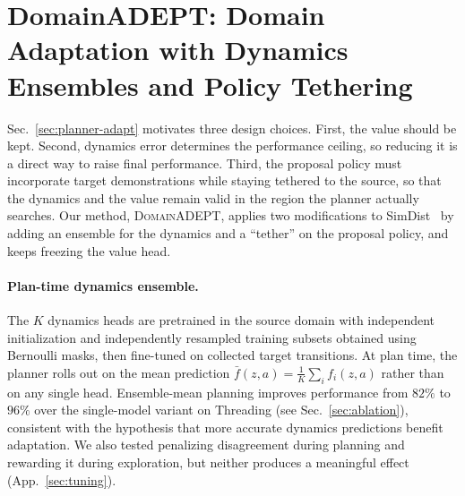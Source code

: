 \documentclass{article} %
\newcommand{\DomainADEPT}{\textsc{DomainADEPT}\xspace}
\begin{document}
\section{DomainADEPT: Domain Adaptation with Dynamics Ensembles and Policy Tethering}
\label{sec:simadept}

Sec.~\ref{sec:planner-adapt} motivates three design choices. First, the value should be kept. Second, dynamics error determines the performance ceiling, so reducing it is a direct way to raise final performance. Third, the proposal policy must incorporate target demonstrations while staying tethered to the source, so that the dynamics and the value remain valid in the region the planner actually searches. Our method, \DomainADEPT, applies two modifications to SimDist~\citep{levy2026simulation} by adding an ensemble for the dynamics and a ``tether'' on the proposal policy, and keeps freezing the value head.

\paragraph{Plan-time dynamics ensemble.}
The $K$ dynamics heads are pretrained in the source domain with independent initialization and independently resampled training subsets obtained using Bernoulli masks, then fine-tuned on collected target transitions. At plan time, the planner rolls out on the mean prediction $\bar{f}(z,a)=\frac{1}{K}\sum_i f_i(z,a)$ rather than on any single head. Ensemble-mean planning improves performance from $82\%$ to $96\%$ over the single-model variant on Threading (see Sec.~\ref{sec:ablation}), consistent with the hypothesis that more accurate dynamics predictions benefit adaptation. We also tested penalizing disagreement during planning and rewarding it during exploration, but neither produces a meaningful effect (App.~\ref{sec:tuning}).
\end{document}
